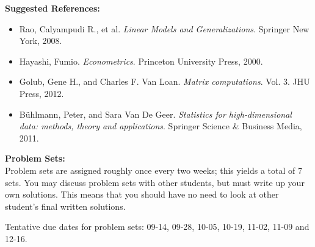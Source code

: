 \documentclass[12pt]{article}
\begin{document}
\vspace{0.5cm}

{\bf Suggested References:}
\begin{itemize}\setlength\itemsep{0em}
\item Rao, Calyampudi R., et al. {\it Linear Models and Generalizations}. Springer New York, 2008.
\item Hayashi, Fumio. {\it Econometrics}. Princeton University Press, 2000.
\item Golub, Gene H., and Charles F. Van Loan. {\it Matrix computations}. Vol. 3. JHU Press, 2012.
\item Bühlmann, Peter, and Sara Van De Geer. {\it Statistics for high-dimensional data: methods, theory and applications}. Springer Science \& Business Media, 2011.
\end{itemize}

\vspace{0.5cm}

{\bf Problem Sets:} \\
Problem sets are assigned roughly once every two weeks;
this yields a total of 7 sets.
You may discuss problem sets with other students, but must write up your
own solutions. This means that you should have no need to look at other
student's final written solutions.

\bigskip

Tentative due dates for problem sets: 09-14, 09-28, 10-05, 10-19, 11-02,
11-09 and 12-16.

\end{document}

